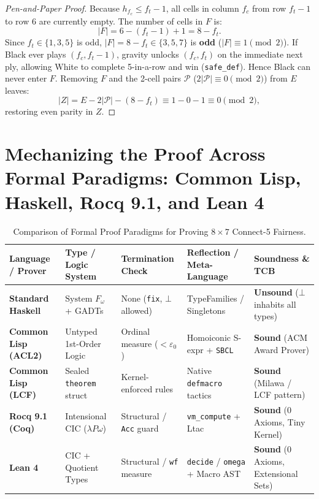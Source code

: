 \documentclass[11pt,reqno]{amsart}
\theoremstyle{plain}
\theoremstyle{definition}
\theoremstyle{remark}
\begin{document}
\begin{proof}[Pen-and-Paper Proof]
Because $h_{f_c} \le f_t - 1$, all cells in column $f_c$ from row $f_t - 1$ to row $6$ are currently empty. The number of cells in $F$ is:
\begin{equation}
|F| = 6 - (f_t - 1) + 1 = 8 - f_t.
\end{equation}
Since $f_t \in \{1, 3, 5\}$ is odd, $|F| = 8 - f_t \in \{3, 5, 7\}$ is \textbf{odd} ($|F| \equiv 1 \pmod 2$). If Black ever plays $(f_c, f_t - 1)$, gravity unlocks $(f_c, f_t)$ on the immediate next ply, allowing White to complete 5-in-a-row and win (\texttt{safe\_def}). Hence Black can never enter $F$. Removing $F$ and the 2-cell pairs $\mathcal{P}$ ($2|\mathcal{P}| \equiv 0 \pmod 2$) from $E$ leaves:
\begin{equation}
|Z| = E - 2|\mathcal{P}| - (8 - f_t) \equiv 1 - 0 - 1 \equiv 0 \pmod 2,
\end{equation}
restoring even parity in $Z$.
\end{proof}

\section{Mechanizing the Proof Across Formal Paradigms: Common Lisp, Haskell, Rocq 9.1, and Lean 4}

\begin{table}[t]
\centering
\caption{Comparison of Formal Proof Paradigms for Proving $8 \times 7$ Connect-5 Fairness.}
\label{tab:paradigms}
\begin{tabular}{lllll}
\toprule
\textbf{Language / Prover} & \textbf{Type / Logic System} & \textbf{Termination Check} & \textbf{Reflection / Meta-Language} & \textbf{Soundness \& TCB} \\
\midrule
\textbf{Standard Haskell} & $\text{System } F_\omega$ + GADTs & None (\texttt{fix}, $\bot$ allowed) & TypeFamilies / Singletons & \textbf{Unsound} ($\bot$ inhabits all types) \\
\textbf{Common Lisp (ACL2)} & Untyped 1st-Order Logic & Ordinal measure ($<\varepsilon_0$) & Homoiconic S-expr + \texttt{SBCL} & \textbf{Sound} (ACM Award Prover) \\
\textbf{Common Lisp (LCF)} & Sealed \texttt{theorem} struct & Kernel-enforced rules & Native \texttt{defmacro} tactics & \textbf{Sound} (Milawa / LCF pattern) \\
\textbf{Rocq 9.1 (Coq)} & Intensional CIC ($\lambda P\omega$) & Structural / \texttt{Acc} guard & \texttt{vm\_compute} + Ltac & \textbf{Sound} (0 Axioms, Tiny Kernel) \\
\textbf{Lean 4} & CIC + Quotient Types & Structural / \texttt{wf} measure & \texttt{decide} / \texttt{omega} + Macro AST & \textbf{Sound} (0 Axioms, Extensional Sets) \\
\bottomrule
\end{tabular}
\end{table}
\end{document}
